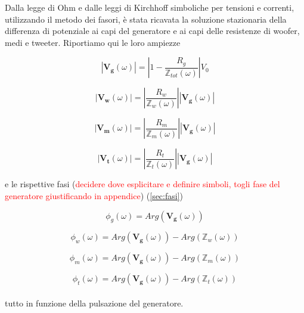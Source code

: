 \documentclass[12pt,italian]{article}
\newcommand{\err}[1]{\textcolor{red}{#1}}
\begin{document}
Dalla legge di Ohm e dalle leggi di Kirchhoff simboliche per tensioni e
correnti, utilizzando il metodo dei fasori, è stata ricavata la soluzione
stazionaria della differenza di potenziale ai capi del generatore e ai capi
delle resistenze di woofer, medi e tweeter. Riportiamo qui le loro ampiezze

\begin{equation}
	\left| \mathbf{V_{g}}(\omega) \right| = \left| 1 - \frac{R_g}
	{\mathbb{Z}_{tot}(\omega)}\right| V_{0}
	\label{eq:Vg}
\end{equation}

\begin{equation}
	\left| \mathbf{V_{w}}(\omega) \right| = \left| \frac{R_{w}}
	{\mathbb{Z}_{w}(\omega)}\right|\left| \mathbf{V_{g}}(\omega) \right|
	\label{eq:Vw}
\end{equation}

\begin{equation}
	\left| \mathbf{V_{m}}(\omega) \right| = \left| \frac{R_{m}}
	{\mathbb{Z}_{m}(\omega)}\right|\left| \mathbf{V_{g}}(\omega) \right|
	\label{eq:Vm}
\end{equation}

\begin{equation}
	\left| \mathbf{V_{t}}(\omega) \right| = \left| \frac{R_{t}}
	{\mathbb{Z}_{t}(\omega)}\right|\left| \mathbf{V_{g}}(\omega) \right|
	\label{eq:Vt}
\end{equation}

\noindent
e le rispettive fasi (\err{decidere dove esplicitare e definire simboli, togli fase del generatore giustificando in appendice}) (\ref{sec:fasi})

\begin{equation}
	\phi_{g}(\omega) = Arg(\mathbf{V_{g}}(\omega))
\end{equation}

\begin{equation}
	\phi_{w}(\omega) = Arg(\mathbf{V_{g}}(\omega)) - Arg(\mathbb{Z}_{w}(\omega))
\end{equation}

\begin{equation}
	\phi_{m}(\omega) = Arg(\mathbf{V_{g}}(\omega)) - Arg(\mathbb{Z}_{m}(\omega))
\end{equation}

\begin{equation}
	\phi_{t}(\omega) =  Arg(\mathbf{V_{g}}(\omega)) - Arg(\mathbb{Z}_{t}(\omega))
\end{equation}
\\
tutto in funzione della pulsazione del generatore.
\end{document}
